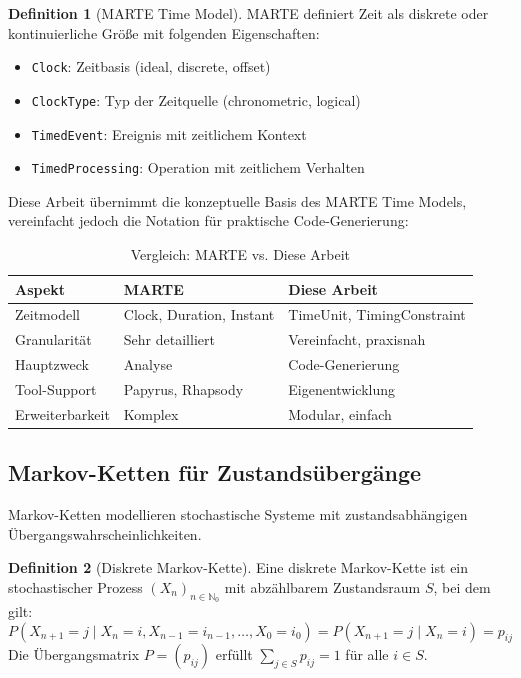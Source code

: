 ﻿\documentclass[a4paper,12pt]{scrreprt}
\theoremstyle{definition}
\newtheorem{definition}{Definition}[section]
\begin{document}
\begin{definition}[MARTE Time Model]
	MARTE definiert Zeit als diskrete oder kontinuierliche Größe mit folgenden Eigenschaften:
	\begin{itemize}
		\item[-] \texttt{Clock}: Zeitbasis (ideal, discrete, offset)
		\item[-] \texttt{ClockType}: Typ der Zeitquelle (chronometric, logical)
		\item[-] \texttt{TimedEvent}: Ereignis mit zeitlichem Kontext
		\item[-] \texttt{TimedProcessing}: Operation mit zeitlichem Verhalten
	\end{itemize}
\end{definition}

Diese Arbeit übernimmt die konzeptuelle Basis des MARTE Time Models, vereinfacht jedoch die Notation für praktische Code-Generierung:

\begin{table}[H]
	\centering
	\begin{tabular}{@{}lll@{}}
		\toprule
		\textbf{Aspekt} & \textbf{MARTE} & \textbf{Diese Arbeit} \\
		\midrule
		Zeitmodell & Clock, Duration, Instant & TimeUnit, TimingConstraint \\
		Granularität & Sehr detailliert & Vereinfacht, praxisnah \\
		Hauptzweck & Analyse & Code-Generierung \\
		Tool-Support & Papyrus, Rhapsody & Eigenentwicklung \\
		Erweiterbarkeit & Komplex & Modular, einfach \\
		\bottomrule
	\end{tabular}
	\caption{Vergleich: MARTE vs. Diese Arbeit}
	\label{tab:marte-comparison}
\end{table}

\subsection{Markov-Ketten für Zustandsübergänge}

Markov-Ketten \cite{stewart1994} modellieren stochastische Systeme mit zustandsabhängigen Übergangs\-wahrscheinlichkeiten.

\begin{definition}[Diskrete Markov-Kette]
	Eine diskrete Markov-Kette ist ein stochastischer Prozess $(X_n)_{n \in \mathbb{N}_0}$ mit abzählbarem Zustandsraum $S$, bei dem gilt:
	\[
	P(X_{n+1} = j \mid X_n = i, X_{n-1} = i_{n-1}, \ldots, X_0 = i_0) = P(X_{n+1} = j \mid X_n = i) = p_{ij}
	\]
	Die Übergangsmatrix $P = (p_{ij})$ erfüllt $\sum_{j \in S} p_{ij} = 1$ für alle $i \in S$.
\end{definition}
\end{document}
